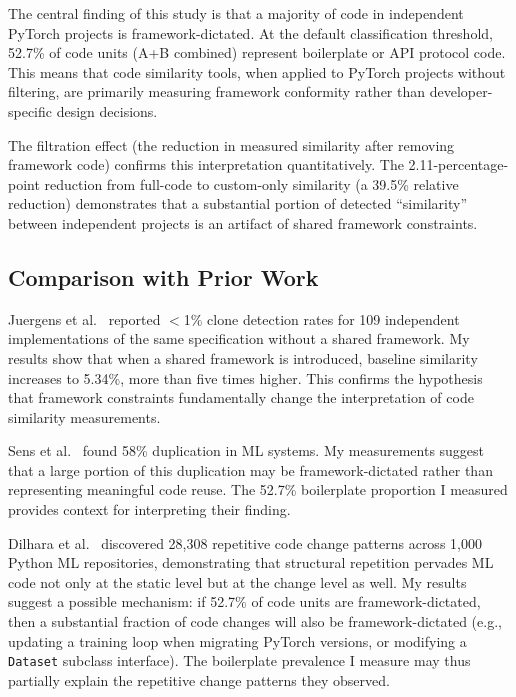 \documentclass[smallextended,natbib]{svjour3}
\begin{document}
The central finding of this study is that a majority of code in independent PyTorch projects is framework-dictated. At the default classification threshold, 52.7\% of code units (A+B combined) represent boilerplate or API protocol code. This means that code similarity tools, when applied to PyTorch projects without filtering, are primarily measuring framework conformity rather than developer-specific design decisions.

The filtration effect (the reduction in measured similarity after removing framework code) confirms this interpretation quantitatively. The 2.11-percentage-point reduction from full-code to custom-only similarity (a 39.5\% relative reduction) demonstrates that a substantial portion of detected ``similarity'' between independent projects is an artifact of shared framework constraints.

\subsection{Comparison with Prior Work}

Juergens et al.~\citep{juergens2010} reported $<$1\% clone detection rates for 109 independent implementations of the same specification without a shared framework. My results show that when a shared framework is introduced, baseline similarity increases to 5.34\%, more than five times higher. This confirms the hypothesis that framework constraints fundamentally change the interpretation of code similarity measurements.

Sens et al.~\citep{sens2025} found 58\% duplication in ML systems. My measurements suggest that a large portion of this duplication may be framework-dictated rather than representing meaningful code reuse. The 52.7\% boilerplate proportion I measured provides context for interpreting their finding.

Dilhara et al.~\citep{dilhara2022} discovered 28,308 repetitive code change patterns across 1,000 Python ML repositories, demonstrating that structural repetition pervades ML code not only at the static level but at the change level as well. My results suggest a possible mechanism: if 52.7\% of code units are framework-dictated, then a substantial fraction of code changes will also be framework-dictated (e.g., updating a training loop when migrating PyTorch versions, or modifying a \texttt{Dataset} subclass interface). The boilerplate prevalence I measure may thus partially explain the repetitive change patterns they observed.
\end{document}
